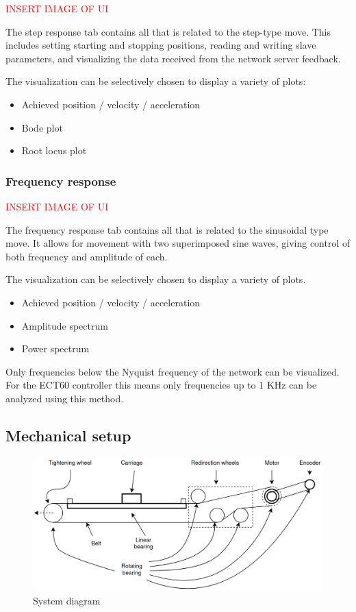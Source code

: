 \textcolor{red}{INSERT IMAGE OF UI}

The step response tab contains all that is related to the step-type move. 
This includes setting starting and stopping positions, reading and writing slave parameters, and visualizing the data received from the network server feedback. 

The visualization can be selectively chosen to display a variety of plots:
\begin{itemize}
	\item Achieved position / velocity / acceleration
	\item Bode plot
	\item Root locus plot
\end{itemize}

\subsubsection{Frequency response}

\textcolor{red}{INSERT IMAGE OF UI}

The frequency response tab contains all that is related to the sinusoidal type move. 
It allows for movement with two superimposed sine waves, giving control of both frequency and amplitude of each. 

The visualization can be selectively chosen to display a variety of plots.

\begin{itemize}
	\item Achieved position / velocity / acceleration
	\item Amplitude spectrum
	\item Power spectrum
\end{itemize}

Only frequencies below the Nyquist frequency of the network can be visualized.
For the ECT60 controller this means only frequencies up to 1 KHz can be analyzed using this method. 

\subsection{Mechanical setup}

\begin{figure}[H]
	\centering
	\includegraphics[width=\linewidth]{../resources/figures/mechanical_system.png}
	\caption{System diagram}
	\label{fig:mechanical_system_diagram}
\end{figure}

